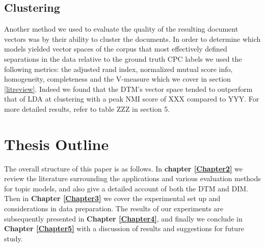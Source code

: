 

\subsection{Clustering}
Another method we used to evaluate the quality of the resulting document vectors was by their ability to cluster the documents. In order to determine which models yielded vector spaces of the corpus that most effectively defined separations in the data relative to the ground truth CPC labels we used the following metrics: the adjusted rand index, normalized mutual score info, homogeneity, completeness and the V-measure which we cover in section \ref{litreview}. Indeed we found that the DTM's vector space tended to outperform that of LDA at clustering with a peak NMI score of XXX compared to YYY. For more detailed results, refer to table ZZZ in section 5. 


 


\section{Thesis Outline}
The overall structure of this paper is as follows. In \textbf{chapter \ref{Chapter2}} we review the literature surrounding the applications and various evaluation methods for topic models,  and also give a detailed account of both the DTM and DIM.
Then in \textbf{Chapter \ref{Chapter3}} we cover the experimental set up and considerations in data preparation. The results of our experiments are subsequently presented in \textbf{Chapter \ref{Chapter4}}, and finally we conclude in \textbf{Chapter \ref{Chapter5}} with a discussion of results and suggestions for future study.




